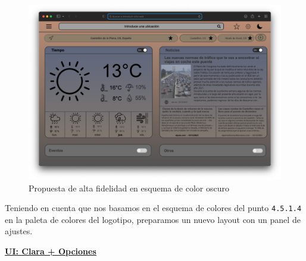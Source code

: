 \documentclass[../ei103948-project-documentation.tex]{subfiles}
\begin{document}
                                \begin{figure}[H]
                                    \begin{center}
                                        \hspace*{-5mm}
                                    \includegraphics[scale=0.87]{images/Boceto3.png}
                                    \end{center}
                                    \caption{Propuesta de alta fidelidad en esquema de color oscuro}
                                \end{figure}


                                Teniendo en cuenta que nos basamos en el esquema de colores del punto \texttt{4.5.1.4} en la paleta de colores del logotipo, preparamos un nuevo layout con un panel de ajustes.

                                \newpage
                                \begin{center}
                                    \underline{\textbf{UI: Clara + Opciones}}
                                \end{center}
\end{document}
